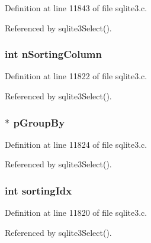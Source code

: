 Definition at line 11843 of file sqlite3.\+c.



Referenced by sqlite3\+Select().

\hypertarget{struct_agg_info_ab28e40461501c58ce019de060fb5d35f}{}
\subsubsection[{n\+Sorting\+Column}]{\setlength{\rightskip}{0pt plus 5cm}int n\+Sorting\+Column}\label{struct_agg_info_ab28e40461501c58ce019de060fb5d35f}


Definition at line 11822 of file sqlite3.\+c.



Referenced by sqlite3\+Select().

\hypertarget{struct_agg_info_ab73f489b26450bf7c199d78c93092cea}{}
\subsubsection[{p\+Group\+By}]{$\ast$ p\+Group\+By}\label{struct_agg_info_ab73f489b26450bf7c199d78c93092cea}


Definition at line 11824 of file sqlite3.\+c.



Referenced by sqlite3\+Select().

\hypertarget{struct_agg_info_ac9628ba6d40fe1a8afe480fc7e7cb3f6}{}
\subsubsection[{sorting\+Idx}]{\setlength{\rightskip}{0pt plus 5cm}int sorting\+Idx}\label{struct_agg_info_ac9628ba6d40fe1a8afe480fc7e7cb3f6}


Definition at line 11820 of file sqlite3.\+c.



Referenced by sqlite3\+Select().

\hypertarget{struct_agg_info_a7bfac432926e3f589e8527c7f7d9bff1}{}
